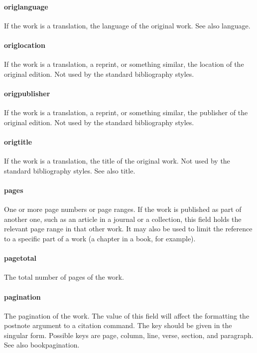 \documentclass[a4paper,12pt]{report}
\begin{document}
\paragraph{origlanguage}
If the work is a translation, the language of the original work. See also language.

\paragraph{origlocation}
If the work is a translation, a reprint, or something similar, the location of the original
edition. Not used by the standard bibliography styles.

\paragraph{origpublisher}
If the work is a translation, a reprint, or something similar, the publisher of the original
edition. Not used by the standard bibliography styles.

\paragraph{origtitle}
If the work is a translation, the title of the original work. Not used by the standard
bibliography styles. See also title.

\paragraph{pages}
One or more page numbers or page ranges. If the work is published as part of another one,
such as an article in a journal or a collection, this field holds the relevant page range in
that other work. It may also be used to limit the reference to a specific part of a work (a
chapter in a book, for example).

\paragraph{pagetotal}
The total number of pages of the work.

\paragraph{pagination}
The pagination of the work. The value of this field will affect the formatting the postnote
argument to a citation command. The key should be given in the singular form. Possible
keys are page, column, line, verse, section, and paragraph. See also bookpagination.
\end{document}
